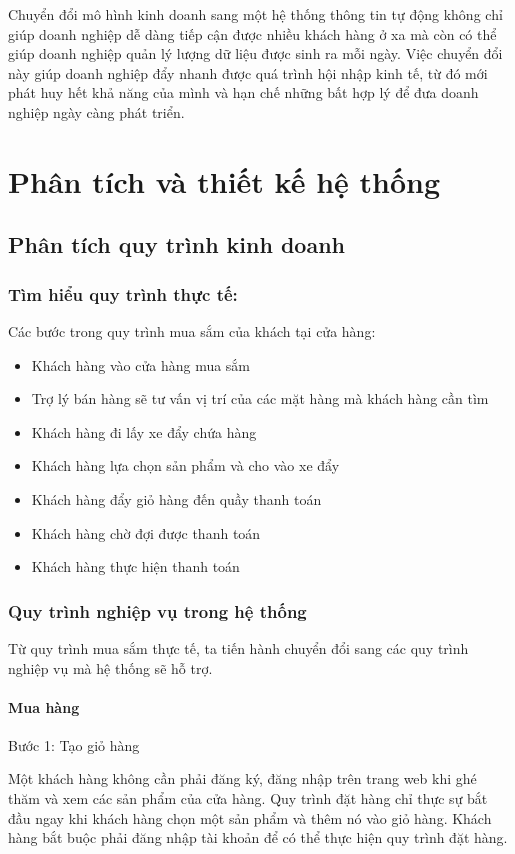 \documentclass[12pt,a4paper,2sides]{report}
\begin{document}
Chuyển đổi mô hình kinh doanh sang một hệ thống thông tin tự động không chỉ giúp doanh nghiệp dễ dàng tiếp cận được nhiều khách hàng ở xa mà còn có thể giúp doanh nghiệp quản lý lượng dữ liệu được sinh ra mỗi ngày. Việc chuyển đổi này giúp doanh nghiệp đẩy nhanh được quá trình hội nhập kinh tế, từ đó mới phát huy hết khả năng của mình và hạn chế những bất hợp lý để đưa doanh nghiệp ngày càng phát triển.


\chapter{Phân tích và thiết kế hệ thống}
\section{Phân tích quy trình kinh doanh}
\subsection{Tìm hiểu quy trình thực tế:}
Các bước trong quy trình mua sắm của khách tại cửa hàng:
\begin{itemize}
    \item Khách hàng vào cửa hàng mua sắm
    \item Trợ lý bán hàng sẽ tư vấn vị trí của các mặt hàng mà khách hàng cần tìm
    \item Khách hàng đi lấy xe đẩy chứa hàng
    \item Khách hàng lựa chọn sản phẩm và cho vào xe đẩy
    \item Khách hàng đẩy giỏ hàng đến quầy thanh toán
    \item Khách hàng chờ đợi được thanh toán
    \item Khách hàng thực hiện thanh toán
\end{itemize}
\subsection{Quy trình nghiệp vụ trong hệ thống}
Từ quy trình mua sắm thực tế, ta tiến hành chuyển đổi sang các quy trình nghiệp vụ mà hệ thống sẽ hỗ trợ. 
\subsubsection{Mua hàng}
Bước 1: Tạo giỏ hàng 

Một khách hàng không cần phải đăng ký, đăng nhập trên trang web khi ghé thăm và xem các sản phẩm của cửa hàng. Quy trình đặt hàng chỉ thực sự bắt đầu ngay khi khách hàng chọn một sản phẩm và thêm nó vào giỏ hàng. Khách hàng bắt buộc phải đăng nhập tài khoản để có thể thực hiện quy trình đặt hàng.
\end{document}
